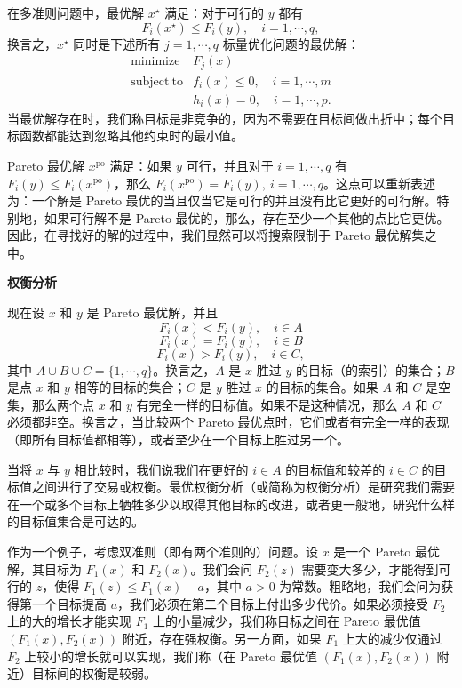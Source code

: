 \documentclass[UTF8, 12pt, fontset=fandol, oneside]{ctexart}
\begin{document}
在多准则问题中，最优解 $x^\star$ 满足：对于可行的 $y$ 都有
\[
F_i(x^\star)\leq F_i(y),\quad i=1,\cdots,q,
\]
换言之，$x^\star$ 同时是下述所有 $j=1,\cdots,q$ 标量优化问题的最优解：
\[
\begin{array}{ll}
\mathop{\mathrm{minimize}} & F_j(x)\\
\mathrm{subject\ to} & f_i(x)\leq 0,\quad i=1,\cdots,m\\
& h_i(x)=0,\quad i=1,\cdots,p.
\end{array}
\]
当最优解存在时，我们称目标是非竞争的，因为不需要在目标间做出折中；每个目标函数都能达到忽略其他约束时的最小值。

Pareto 最优解 $x^{\mathrm{po}}$ 满足：如果 $y$ 可行，并且对于 $i=1,\cdots,q$ 有 $F_i(y)\leq F_i(x^{\mathrm{po}})$，那么 $F_i(x^{\mathrm{po}})=F_i(y),\ i=1,\cdots,q$。这点可以重新表述为：一个解是 Pareto 最优的当且仅当它是可行的并且没有比它更好的可行解。特别地，如果可行解不是 Pareto 最优的，那么，存在至少一个其他的点比它更优。因此，在寻找好的解的过程中，我们显然可以将搜索限制于 Pareto 最优解集之中。

\noindent\textbf{权衡分析}

现在设 $x$ 和 $y$ 是 Pareto 最优解，并且
\[
F_i(x)<F_i(y),\quad i\in A
\]
\[
F_i(x)=F_i(y),\quad i\in B
\]
\[
F_i(x)>F_i(y),\quad i\in C,
\]
其中 $A\cup B\cup C=\{1,\cdots,q\}$。换言之，$A$ 是 $x$ 胜过 $y$ 的目标（的索引）的集合；$B$ 是点 $x$ 和 $y$ 相等的目标的集合；$C$ 是 $y$ 胜过 $x$ 的目标的集合。如果 $A$ 和 $C$ 是空集，那么两个点 $x$ 和 $y$ 有完全一样的目标值。如果不是这种情况，那么 $A$ 和 $C$ 必须都非空。换言之，当比较两个 Pareto 最优点时，它们或者有完全一样的表现（即所有目标值都相等），或者至少在一个目标上胜过另一个。

当将 $x$ 与 $y$ 相比较时，我们说我们在更好的 $i\in A$ 的目标值和较差的 $i\in C$ 的目标值之间进行了交易或权衡。最优权衡分析（或简称为权衡分析）是研究我们需要在一个或多个目标上牺牲多少以取得其他目标的改进，或者更一般地，研究什么样的目标值集合是可达的。

作为一个例子，考虑双准则（即有两个准则的）问题。设 $x$ 是一个 Pareto 最优解，其目标为 $F_1(x)$ 和 $F_2(x)$。我们会问 $F_2(z)$ 需要变大多少，才能得到可行的 $z$，使得 $F_1(z)\leq F_1(x)-a$，其中 $a>0$ 为常数。粗略地，我们会问为获得第一个目标提高 $a$，我们必须在第二个目标上付出多少代价。如果必须接受 $F_2$ 上的大的增长才能实现 $F_1$ 上的小量减少，我们称目标之间在 Pareto 最优值 $(F_1(x),F_2(x))$ 附近，存在强权衡。另一方面，如果 $F_1$ 上大的减少仅通过 $F_2$ 上较小的增长就可以实现，我们称（在 Pareto 最优值 $(F_1(x),F_2(x))$ 附近）目标间的权衡是较弱。
\end{document}
